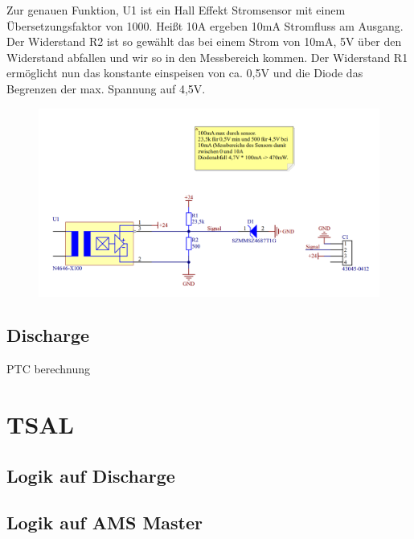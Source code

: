 Zur genauen Funktion, U1 ist ein Hall Effekt Stromsensor mit einem Übersetzungsfaktor von 1000. Heißt 10A ergeben 10mA Stromfluss am Ausgang. Der Widerstand R2 ist so gewählt das bei einem Strom von 10mA, 5V über den Widerstand abfallen und wir so in den Messbereich kommen. Der Widerstand R1 ermöglicht nun das konstante einspeisen von ca. 0,5V und die Diode das Begrenzen der max. Spannung auf 4,5V.

\begin{figure}
	\centering
	\includegraphics[width=0.7\linewidth]{"bilder/Sensorboard Schaltung"}
	\caption{}
	\label{fig:sensorboard-schaltung}
\end{figure}

\subsection{Discharge}
PTC berechnung

\section{TSAL}

\subsection{Logik auf Discharge}

\subsection{Logik auf AMS Master}